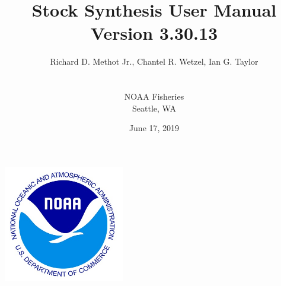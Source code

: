 \documentclass[12pt]{article}
\title{\textcolor[cmyk]{1.00,0.83,0.41,0.36}{Stock Synthesis User Manual\\ Version 3.30.13}}
\author{Richard D. Methot Jr., Chantel R. Wetzel, Ian G. Taylor\\\\\\NOAA Fisheries\\Seattle, WA}
\date{June 17, 2019}
\begin{document}
	\maketitle
	\begin{center}
		\includegraphics[height=2in]{noaalogo.jpg}
	\end{center}

	\thispagestyle{empty}
	\newpage
	\normalfont %
	\normalsize %

		
	\tableofcontents
	\thispagestyle{empty}
	\cleardoublepage
	\setcounter{secnumdepth}{0}
	\newpage
	\raggedright
	\renewcommand{\headrulewidth}{0pt} %
	\cleardoublepage

	
	
	
	
	
	
	
	
		
		
		
	
		
	\newpage
	
	
	\newpage	
		
		
		
		
		

		
\end{document}
